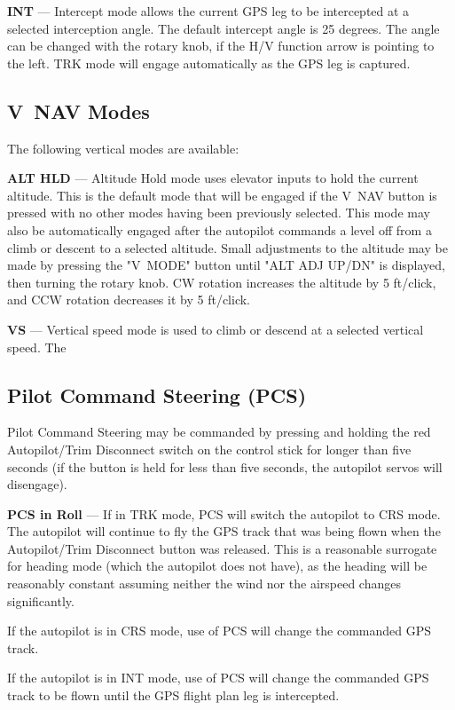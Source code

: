 \textbf{INT} --- Intercept mode allows the current GPS leg to be intercepted at a selected interception angle. The default intercept angle is 25 degrees. The angle can be changed with the rotary knob, if the H/V function arrow is pointing to the left. TRK mode will engage automatically as the GPS leg is captured.

\subsection*{V~NAV Modes}
The following vertical modes are available:

\textbf{ALT HLD} --- Altitude Hold mode uses elevator inputs to hold the current altitude. This is the default mode that will be engaged if the V~NAV button is pressed with no other modes having been previously selected. This mode may also be automatically engaged after the autopilot commands a level off from a climb or descent to a selected altitude. Small adjustments to the altitude may be made by pressing the "V~MODE" button until "ALT ADJ UP/DN" is displayed, then turning the rotary knob. CW rotation increases the altitude by 5 ft/click, and CCW rotation decreases it by 5 ft/click.

\textbf{VS} --- Vertical speed mode is used to climb or descend at a selected vertical speed. The 

\subsection*{Pilot Command Steering (PCS)}

Pilot Command Steering may be commanded by pressing and holding the red Autopilot/Trim Disconnect switch on the control stick for longer than five seconds (if the button is held for less than five seconds, the autopilot servos will disengage).

\textbf{PCS in Roll} --- If in TRK mode, PCS will switch the autopilot to CRS mode. The autopilot will continue to fly the GPS track that was being flown when the Autopilot/Trim Disconnect button was released. This is a reasonable surrogate for heading mode (which the autopilot does not have), as the heading will be reasonably constant assuming neither the wind nor the airspeed changes significantly. 

If the autopilot is in CRS mode, use of PCS will change the commanded GPS track.

If the autopilot is in INT mode, use of PCS will change the commanded GPS track to be flown until the GPS flight plan leg is intercepted.

